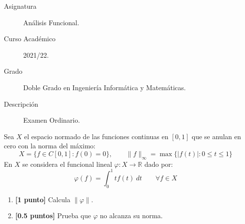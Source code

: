 \documentclass[12pt]{article}
\begin{document}

    
    

    \begin{description}
        \item[Asignatura] Análisis Funcional.
        \item[Curso Académico] 2021/22.
        \item[Grado] Doble Grado en Ingeniería Informática y Matemáticas.
        \item[Descripción] Examen Ordinario.
    
    \end{description}
    \newpage


    
    \begin{ejercicio}[1.5 puntos]
        Sea $X$ el espacio normado de las funciones continuas en $[0,1]$ que se anulan en cero con la norma del máximo:
        \begin{equation*}
            X = \{f\in C[0,1] : f(0) = 0\}, \qquad \|f\|_\infty = \max\{|f(t)| : 0\leq t \leq 1\}
        \end{equation*}
        En $X$ se considera el funcional lineal $\varphi:X\to \mathbb{R}$ dado por:
        \begin{equation*}
            \varphi(f) = \int_{0}^{1} tf(t)~dt \qquad \forall f\in X
        \end{equation*}
        \begin{enumerate}[label=\alph*)]
            \item \textbf{[1 punto]} Calcula $\|\varphi\|$.
            \item \textbf{[0.5 puntos]} Prueba que $\varphi$ no alcanza su norma.
        \end{enumerate}
    \end{ejercicio}
\end{document}
